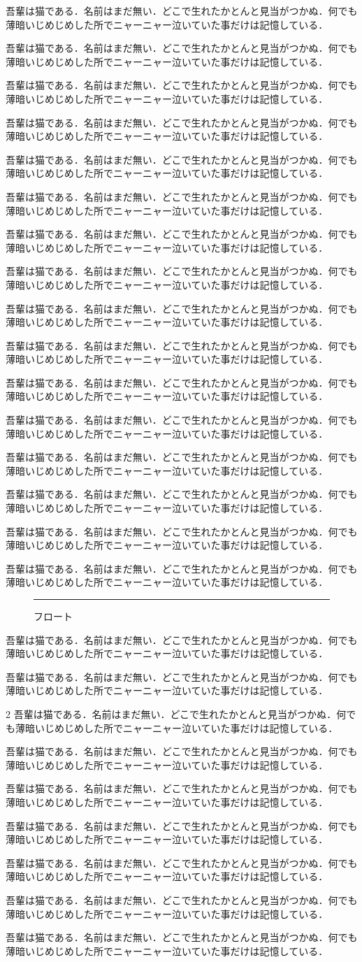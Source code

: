 \documentclass[paper=a4,fontsize=10pt]{jlreq}
\newcommand\para{吾輩は猫である．名前はまだ無い．どこで生れたかとんと見当がつかぬ．何でも薄暗いじめじめした所でニャーニャー泣いていた事だけは記憶している．\par}
\begin{document}
\para\para\para\para\para\para\para\para\para\para\para\para\para\para\para\para
\begin{figure}[tbp]
  \centering
  \rule{.8\linewidth}{6cm}
  \caption{フロート}
\end{figure}
\para\para
\begin{multicols}{2}
\para\para\para\para\para\para
\end{multicols}
\para
\end{document}
